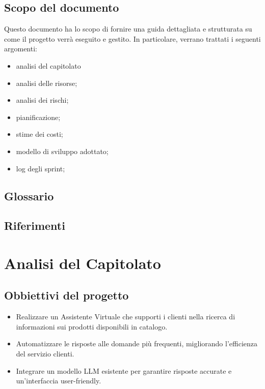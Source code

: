 \documentclass{article}
\begin{document}
    \subsection{Scopo del documento}
    Questo documento ha lo scopo di fornire una guida dettagliata e strutturata su come 
    il progetto verrà eseguito e gestito. In particolare, verrano trattati i seguenti 
    argomenti:
    \begin{itemize}  %
        \item analisi del capitolato
        \item analisi delle risorse;
        \item analisi dei rischi;
        \item pianificazione;
        \item stime dei costi;
        \item modello di sviluppo adottato;
        \item log degli sprint;
    \end{itemize}

    \subsection{Glossario}

    \subsection{Riferimenti}




\newpage
\section{Analisi del Capitolato}
    \subsection{Obbiettivi del progetto}
    \begin{itemize}
        \item Realizzare un Assistente Virtuale che supporti i clienti nella ricerca 
        di informazioni sui prodotti disponibili in catalogo.
        \item Automatizzare le risposte alle domande più frequenti, migliorando 
        l'efficienza del servizio clienti.
        \item Integrare un modello LLM esistente per garantire risposte accurate e 
        un'interfaccia user-friendly.
    \end{itemize}
\end{document}
